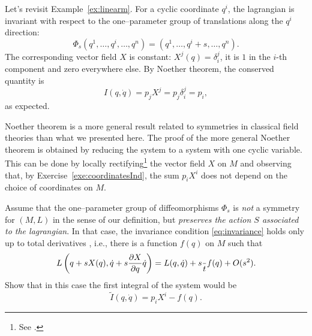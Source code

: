 \documentclass[english,fontsize=11pt,paper=a5,oneside]{scrbook}
\let\d\relax
\newcommand{\d}{\mathrm{d}}
\theoremstyle{definition}
\newenvironment{remark}
  {\pushQED{\qed}\renewcommand{\qedsymbol}{$\lozenge$}\remarkx}
  {\popQED\endremarkx}
\newenvironment{example}
  {\pushQED{\qed}\renewcommand{\qedsymbol}{$\lozenge$}\examplex}
  {\popQED\endexamplex}
\newenvironment{exercise}
  {\pushQED{\qed}\renewcommand{\qedsymbol}{$\maltese$}\exercisex}
  {\popQED\endexercisex}
\begin{document}
\begin{example}[kinetic momentum - reprise]\label{exa:kmom}
  Let's revisit Example~\ref{ex:linearm}.
  For a cyclic coordinate $q^i$, the lagrangian is invariant with respect to the one--parameter group of translations along the $q^i$ direction:
  \begin{equation}
    \Phi_s(q^1, \ldots, q^i, \ldots, q^n) = (q^1, \ldots, q^i + s, \ldots, q^n).
  \end{equation}
  The corresponding vector field $X$ is constant: $X^j(q) = \delta^j_i$, it is $1$ in the $i$-th component and zero everywhere else.
  By Noether theorem, the conserved quantity is
  \begin{equation}
    I(q,\dot q) = p_j X^j = p_j \delta^j_i = p_i,
  \end{equation}
  as expected.
\end{example}

\begin{remark}
  Noether theorem is a more general result related to symmetries in classical field theories than what we presented here.
  The proof of the more general Noether theorem is obtained by reducing the system to a system with one cyclic variable.
  This can be done by locally rectifying\footnote{See \cite[Chapter 3.5]{lectures:aom:seri}.} the vector field $X$ on $M$ and
  observing that, by Exercise~\ref{exe:coordinatesInd}, the sum $p_i X^i$ does not depend on the choice of coordinates on $M$.
\end{remark}

\begin{exercise}
  Assume that the one--parameter group of diffeomorphisms $\Phi_s$ is \emph{not} a symmetry for $(M,L)$ in the sense of our definition, but \emph{preserves the action $S$ associated to the lagrangian}.
  In that case, the invariance condition \eqref{eq:invariance} holds only up to total derivatives \cite[Chapter 4.20]{book:gelfand}, i.e., there is a function $f(q)$ on $M$ such that
  \begin{equation}
    L\left( q + s X(q), \dot q + s \frac{\partial X}{\partial q} \dot q\right)
    = L(q, \dot q) + s \frac{\d}{\d t}f(q) + O(s^2).
  \end{equation}
  Show that in this case the first integral of the system would be
  \begin{equation}
    \widetilde I(q, \dot q) = p_i X^i - f(q).
  \end{equation}
\end{exercise}
\end{document}

